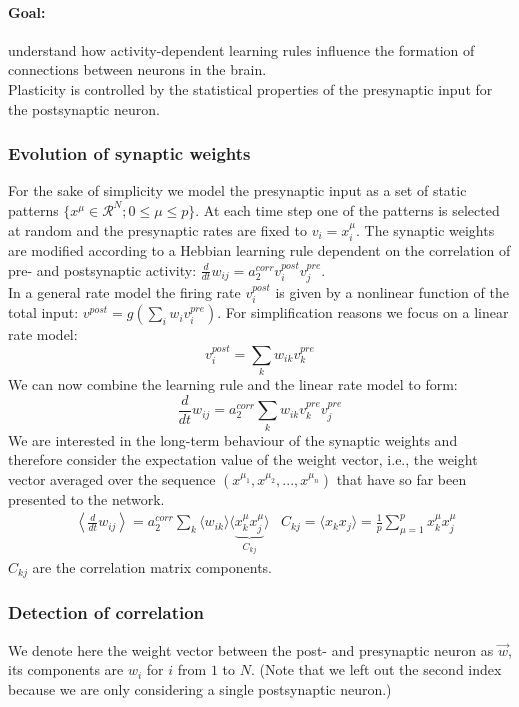 \documentclass[11pt]{article}
\begin{document}
\paragraph{Goal:} understand how activity-dependent learning rules influence the formation of connections between neurons in the brain.\\
Plasticity is controlled by the statistical properties of the presynaptic input for the postsynaptic neuron.
\subsubsection{Evolution of synaptic weights} For the sake of simplicity we model the presynaptic input as a set of static patterns $\{x^\mu \in \mathcal{R}^N; 0\leq \mu \leq p\}$. At each time step one of the patterns is selected at random and the presynaptic rates are fixed to $v_i = x_i^\mu$. The synaptic weights are modified according to a Hebbian learning rule dependent on the correlation of pre- and postsynaptic activity: $\frac{d}{dt}w_{ij}=a_2^{corr}v_i^{post}v_j^{pre}$.\\
In a general rate model the firing rate $v_i^{post}$ is given by a nonlinear function of the total input: $v^{post}=g(\sum_i w_i v_i^{pre})$. For simplification reasons we focus on a linear rate model: 
\[
v_i^{post}=\sum_k w_{ik} v_k^{pre}
\]
We can now combine the learning rule and the linear rate model to form:
\[
\frac{d}{dt}w_{ij}=a_2^{corr} \sum_k w_{ik} v_k^{pre} v_j^{pre}
\]
We are interested in the long-term behaviour of the synaptic weights and therefore consider the expectation value of the weight vector, i.e., the weight vector averaged over the sequence $(x^{\mu_1}, x^{\mu_2}, ..., x^{\mu_n})$ that have so far been presented to the network.
\begin{align*}
&\left\langle \frac{d}{dt}w_{ij} \right\rangle = a_2^{corr}\sum_k \langle w_{ik} \rangle \langle \underbrace{x_k^\mu x_j^\mu}_{C_{kj}} \rangle
&C_{kj}=\langle x_kx_j \rangle = \frac{1}{p}\sum_{\mu=1}^p x_k^\mu x_j^\mu
\end{align*}
$C_{kj}$ are the correlation matrix components.

\subsubsection{Detection of correlation}
\label{sec:correlationDerivation}

We denote here the weight vector between the post- and presynaptic neuron as $\vec{w}$, its components are $w_i$ for $i$ from $1$ to $N$. (Note that we left out the second index because we are only considering a single postsynaptic neuron.)
\end{document}
